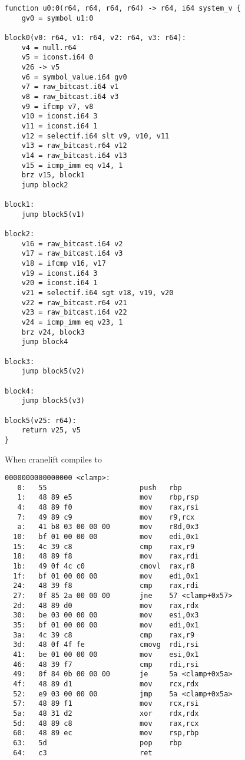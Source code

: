 \begin{verbatim}
function u0:0(r64, r64, r64, r64) -> r64, i64 system_v {
    gv0 = symbol u1:0

block0(v0: r64, v1: r64, v2: r64, v3: r64):
    v4 = null.r64 
    v5 = iconst.i64 0
    v26 -> v5
    v6 = symbol_value.i64 gv0
    v7 = raw_bitcast.i64 v1
    v8 = raw_bitcast.i64 v3
    v9 = ifcmp v7, v8
    v10 = iconst.i64 3
    v11 = iconst.i64 1
    v12 = selectif.i64 slt v9, v10, v11
    v13 = raw_bitcast.r64 v12
    v14 = raw_bitcast.i64 v13
    v15 = icmp_imm eq v14, 1
    brz v15, block1
    jump block2

block1:
    jump block5(v1)

block2:
    v16 = raw_bitcast.i64 v2
    v17 = raw_bitcast.i64 v3
    v18 = ifcmp v16, v17
    v19 = iconst.i64 3
    v20 = iconst.i64 1
    v21 = selectif.i64 sgt v18, v19, v20
    v22 = raw_bitcast.r64 v21
    v23 = raw_bitcast.i64 v22
    v24 = icmp_imm eq v23, 1
    brz v24, block3
    jump block4

block3:
    jump block5(v2)

block4:
    jump block5(v3)

block5(v25: r64):
    return v25, v5
}
\end{verbatim}

When cranelift compiles to

\begin{verbatim}
0000000000000000 <clamp>:
   0:	55                   	push   rbp
   1:	48 89 e5             	mov    rbp,rsp
   4:	48 89 f0             	mov    rax,rsi
   7:	49 89 c9             	mov    r9,rcx
   a:	41 b8 03 00 00 00    	mov    r8d,0x3
  10:	bf 01 00 00 00       	mov    edi,0x1
  15:	4c 39 c8             	cmp    rax,r9
  18:	48 89 f8             	mov    rax,rdi
  1b:	49 0f 4c c0          	cmovl  rax,r8
  1f:	bf 01 00 00 00       	mov    edi,0x1
  24:	48 39 f8             	cmp    rax,rdi
  27:	0f 85 2a 00 00 00    	jne    57 <clamp+0x57>
  2d:	48 89 d0             	mov    rax,rdx
  30:	be 03 00 00 00       	mov    esi,0x3
  35:	bf 01 00 00 00       	mov    edi,0x1
  3a:	4c 39 c8             	cmp    rax,r9
  3d:	48 0f 4f fe          	cmovg  rdi,rsi
  41:	be 01 00 00 00       	mov    esi,0x1
  46:	48 39 f7             	cmp    rdi,rsi
  49:	0f 84 0b 00 00 00    	je     5a <clamp+0x5a>
  4f:	48 89 d1             	mov    rcx,rdx
  52:	e9 03 00 00 00       	jmp    5a <clamp+0x5a>
  57:	48 89 f1             	mov    rcx,rsi
  5a:	48 31 d2             	xor    rdx,rdx
  5d:	48 89 c8             	mov    rax,rcx
  60:	48 89 ec             	mov    rsp,rbp
  63:	5d                   	pop    rbp
  64:	c3                   	ret    

\end{verbatim}


